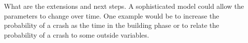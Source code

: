 \documentclass[12pt, a4paper, oneside]{article} %
\begin{document}
What are the extensions and next steps.  A sophisticated model could allow the parameters to change over time.  One example would be to increase the probability of a crash as the time in the building phase or to relate the probability of a crash to some outside variables. 






\end{document}
